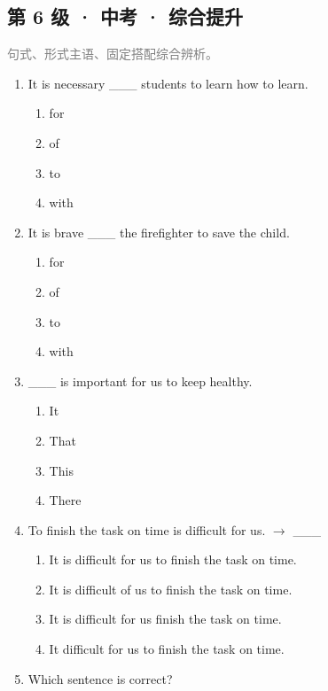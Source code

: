 \documentclass[11pt,a4paper]{ctexart}
\begin{document}
\subsection*{第 6 级 · 中考 · 综合提升}
\noindent\textcolor{gray}{句式、形式主语、固定搭配综合辨析。}\par\smallskip
\begin{enumerate}[leftmargin=*,itemsep=4pt]
\item It is necessary \_\_\_ students to learn how to learn.
\begin{enumerate}[label=\Alph*.,leftmargin=2em,itemsep=1pt,topsep=2pt]
\item for
\item of
\item to
\item with
\end{enumerate}
\item It is brave \_\_\_ the firefighter to save the child.
\begin{enumerate}[label=\Alph*.,leftmargin=2em,itemsep=1pt,topsep=2pt]
\item for
\item of
\item to
\item with
\end{enumerate}
\item \_\_\_ is important for us to keep healthy.
\begin{enumerate}[label=\Alph*.,leftmargin=2em,itemsep=1pt,topsep=2pt]
\item It
\item That
\item This
\item There
\end{enumerate}
\item To finish the task on time is difficult for us. $\rightarrow$ \_\_\_
\begin{enumerate}[label=\Alph*.,leftmargin=2em,itemsep=1pt,topsep=2pt]
\item It is difficult for us to finish the task on time.
\item It is difficult of us to finish the task on time.
\item It is difficult for us finish the task on time.
\item It difficult for us to finish the task on time.
\end{enumerate}
\item Which sentence is correct?
\begin{enumerate}[label=\Alph*.,leftmargin=2em,itemsep=1pt,topsep=2pt]

\end{enumerate}
\end{enumerate}
\end{document}
